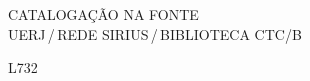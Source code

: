 %
% 


\begin{titlepage}
	\begin{center}
\vfill
\singlespacing
	\vspace*{95mm}
	{CATALOGAÇÃO NA FONTE\\ \vspace{1.5mm}
	UERJ\,/\,REDE SIRIUS\,/\,BIBLIOTECA CTC/B}\\
	\vspace{1.5mm}
	\begin{boxedminipage}{140mm}
	\begin{minipage}{5mm}
		\vspace{-84mm}
		L732
	\end{minipage}
	\hfill
	\raisebox{8.5mm}{
	\begin{minipage}[top]{115mm}
		\vspace*{5mm}


\end{minipage}}
\end{boxedminipage}
\end{center}
\end{titlepage}
